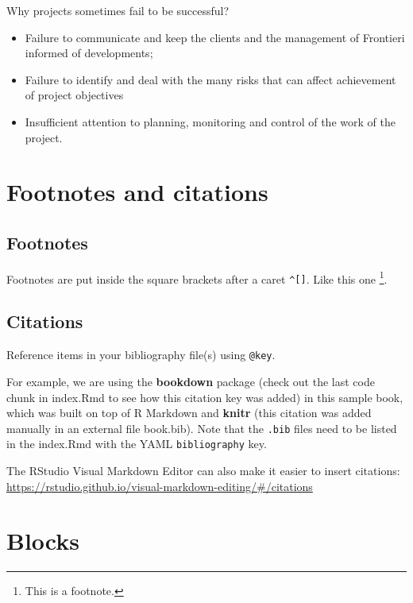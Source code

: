 \documentclass[
]{book}
\theoremstyle{definition}
\theoremstyle{definition}
\theoremstyle{definition}
\theoremstyle{definition}
\theoremstyle{remark}
\begin{document}
Why projects sometimes fail to be successful?

\begin{itemize}
\item
  Failure to communicate and keep the clients and the management of Frontieri informed of developments;
\item
  Failure to identify and deal with the many risks that can affect achievement of project objectives
\item
  Insufficient attention to planning, monitoring and control of the work of the project.
\end{itemize}

\hypertarget{footnotes-and-citations}{%
\chapter{Footnotes and citations}\label{footnotes-and-citations}}

\hypertarget{footnotes}{%
\section{Footnotes}\label{footnotes}}

Footnotes are put inside the square brackets after a caret \texttt{\^{}{[}{]}}. Like this one \footnote{This is a footnote.}.

\hypertarget{citations}{%
\section{Citations}\label{citations}}

Reference items in your bibliography file(s) using \texttt{@key}.

For example, we are using the \textbf{bookdown} package \citep{R-bookdown} (check out the last code chunk in index.Rmd to see how this citation key was added) in this sample book, which was built on top of R Markdown and \textbf{knitr} \citep{xie2015} (this citation was added manually in an external file book.bib).
Note that the \texttt{.bib} files need to be listed in the index.Rmd with the YAML \texttt{bibliography} key.

The RStudio Visual Markdown Editor can also make it easier to insert citations: \url{https://rstudio.github.io/visual-markdown-editing/\#/citations}

\hypertarget{blocks}{%
\chapter{Blocks}\label{blocks}}
\end{document}
